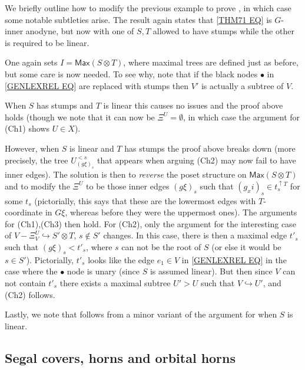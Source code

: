 \documentclass[a4paper,10pt,draft]{article}%
\begin{document}
 
\begin{remark}
We briefly outline how to modify the previous example to prove 
\cite[Thm 7.1(ii)]{Per17}, in which case some notable subtleties arise.
The result again states that \eqref{THM71 EQ} is $G$-inner anodyne, but now with one of $S,T$ allowed to have stumps while the other is required to be linear.

One again sets $I=\mathsf{Max}(S\otimes T)$, where maximal trees are defined just as before, but some care is now needed.
To see why, note that if the black nodes $\bullet$ in \eqref{GENLEXREL EQ} are replaced with stumps then $V'$
is actually a subtree of $V$.

When $S$ has stumps and $T$ is linear this causes no issues and the proof above holds
(though we note that it can now be 
$\Xi^U=\emptyset$, in which case the argument for (Ch1) shows $U\in X$).

However, when $S$ is linear and $T$ has stumps the proof above breaks down (more precisely, the tree $U_{(g\xi)_s}^{<s}$ that appears when arguing (Ch2) may now fail to have inner edges). The solution is then to \textit{reverse} the poset structure on 
$\mathsf{Max}(S\otimes T)$
and to modify the $\Xi^U$ to be those inner edges $(g \xi)_s$ such that
$(g _xi)_s \in t_s^{\uparrow T}$ for some $t_s$
(pictorially, this says that these are the lowermost edges with $T$-coordinate in $G\xi$, whereas before they were the uppermost ones). The arguments for (Ch1),(Ch3) then hold.
For (Ch2), only the argument for the interesting case of
$V- \Xi_V^U \hookrightarrow S' \otimes T$, $s \not \in S'$
changes. In this case, there is then a maximal edge $t'_s$ such that $(g \xi)_s < t'_s$, where $s$ can not be the root of $S$ (or else it would be $s \in S'$). Pictorially, $t'_s$ looks like the edge $e_1 \in V$ in \eqref{GENLEXREL EQ} in the case where the $\bullet$ node is unary (since $S$ is assumed linear). But then since $V$ can not contain $t'_s$ there exists a maximal subtree $U' > U$ such that $V \hookrightarrow U'$,
and (Ch2) follows.

Lastly, we note that \cite[Thm. 7.2]{Per17} follows from a minor variant of the argument for \cite[Thm. 7.1(ii)]{Per17} when $S$ is linear.
\end{remark}



\subsection{Segal covers, horns and orbital horns}\label{HYPERSAT SEC}
\end{document}
